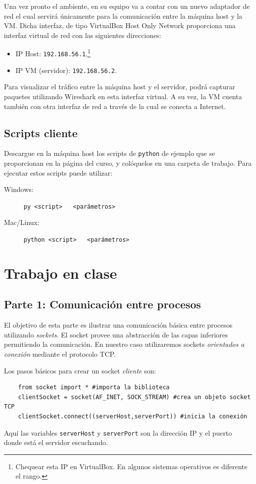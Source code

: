 \documentclass[a4paper,10pt]{article}
\begin{document}
Una vez pronto el ambiente, en su equipo va a contar con un nuevo adaptador de red el cual servirá únicamente para la comunicación entre la máquina host y la VM. Dicha interfaz, de tipo VirtualBox Host Only Network proporciona una interfaz virtual de red con las siguientes direcciones:
\begin{itemize}
    \item IP Host: \texttt{192.168.56.1},\footnote{Chequear esta IP en VirtualBox. En algunos sistemas operativos es diferente el rango.}
    \item IP VM (servidor): \texttt{192.168.56.2}.
\end{itemize}
Para visualizar el tráfico entre la máquina host y el servidor, podrá capturar paquetes utilizando Wireshark en esta interfaz virtual. A su vez, la VM cuenta también con otra interfaz de red a través de la cual se conecta a Internet.

\subsection*{Scripts cliente}

Descargue en la máquina host los scripts de \texttt{python} de ejemplo que se proporcionan en la página del curso, y colóquelos en una carpeta de trabajo. Para ejecutar estos scripts puede utilizar:
\begin{description}
    \item[Windows:] \texttt{py <script> \, <parámetros>}
    \item[Mac/Linux:] \texttt{python <script> \, <parámetros>}
\end{description}

\section*{Trabajo en clase}

\subsection*{Parte 1: Comunicación entre procesos}

El objetivo de esta parte es ilustrar una comunicación básica entre procesos utilizando \emph{sockets}. El socket provee una abstracción de las capas inferiores permitiendo la comunicación. En nuestro caso utilizaremos sockets \emph{orientados a conexión} mediante el protocolo TCP.

Los pasos básicos para crear un socket \emph{cliente} son:
\begin{verbatim}
    from socket import * #importa la biblioteca
    clientSocket = socket(AF_INET, SOCK_STREAM) #crea un objeto socket TCP
    clientSocket.connect((serverHost,serverPort)) #inicia la conexión
\end{verbatim}
Aquí las variables \texttt{serverHost} y \texttt{serverPort} son la dirección IP y el puerto donde está el servidor escuchando.
\end{document}
